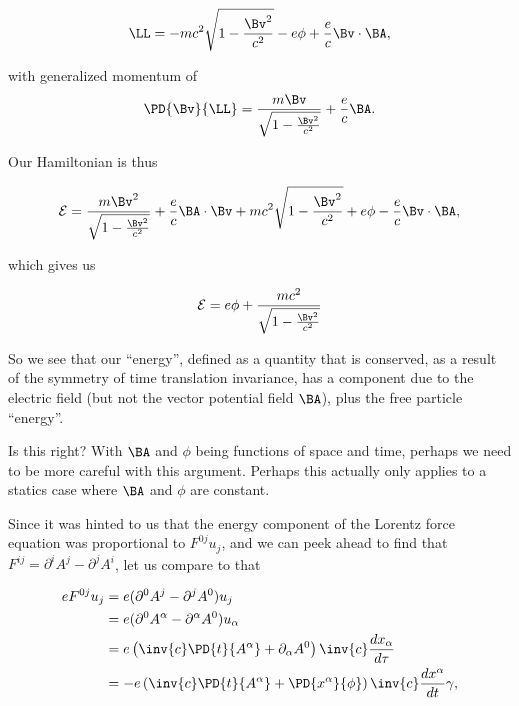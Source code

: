 {\begin{equation}\label{eqn:relativisticElectrodynamicsT3:531}
\LL = 
- m c^2 \sqrt{1 - \frac{\Bv^2}{c^2}} - e \phi + \frac{e}{c} \Bv \cdot \BA,
\end{equation}

with generalized momentum of 
\begin{equation}\label{eqn:relativisticElectrodynamicsT3:532}
\PD{\Bv}{\LL} = \frac{m \Bv}{\sqrt{1 - \frac{\Bv^2}{c^2}}} + \frac{e}{c} \BA.
\end{equation}

Our Hamiltonian is thus

\begin{equation}\label{eqn:relativisticElectrodynamicsT3:1050}
\begin{aligned}
\mathcal{E} 
= 
\frac{m \Bv^2}{\sqrt{1 - \frac{\Bv^2}{c^2}}} + \frac{e}{c} \BA \cdot \Bv
+ m c^2 \sqrt{1 - \frac{\Bv^2}{c^2}} + e \phi - \frac{e}{c} \Bv \cdot \BA,
\end{aligned}
\end{equation}

which gives us

\begin{equation}\label{eqn:relativisticElectrodynamicsT3:1070}
\begin{aligned}
\mathcal{E} = e \phi + \frac{m c^2}{\sqrt{1 - \frac{\Bv^2}{c^2}}} 
\end{aligned}
\end{equation}

So we see that our ``energy'', defined as a quantity that is conserved, as a result of the symmetry of time translation invariance, has a component due to the electric field (but not the vector potential field \(\BA\)), plus the free particle ``energy''.

Is this right?  With \(\BA\) and \(\phi\) being functions of space and time, perhaps we need to be more careful with this argument.  Perhaps this actually only applies to a statics case where \(\BA\) and \(\phi\) are constant.

Since it was hinted to us that the energy component of the Lorentz force equation was proportional to \(F^{0j} u_j\), and we can peek ahead to find that \(F^{ij} = \partial^i A^j - \partial^j A^i\), let us compare to that

\begin{equation}\label{eqn:relativisticElectrodynamicsT3:1090}
\begin{aligned}
e F^{0 j} u_j
&=
e (\partial^0 A^j - \partial^j A^0) u_j \\
&=
e (\partial^0 A^\alpha - \partial^\alpha A^0) u_\alpha \\
&=
e \left( \inv{c} \PD{t}{A^\alpha} + \partial_\alpha A^0 \right) \inv{c} \frac{dx_\alpha}{d\tau} \\
&=
-e \left( \inv{c} \PD{t}{A^\alpha} + \PD{x^\alpha}{\phi} \right) \inv{c} \frac{dx^\alpha}{dt} \gamma,
\end{aligned}
\end{equation}

}
